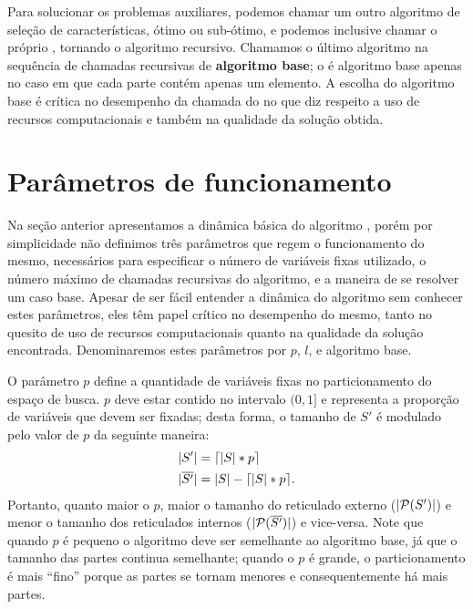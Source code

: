 Para solucionar os problemas auxiliares, podemos chamar um outro 
algoritmo de seleção de características, ótimo ou sub-ótimo, e podemos 
inclusive chamar o próprio , tornando o algoritmo 
recursivo. Chamamos o último algoritmo na sequência de chamadas 
recursivas de {\bf algoritmo base}; o  é algoritmo base 
apenas no caso em que cada parte contém apenas um elemento. A escolha do
algoritmo base é crítica no desempenho da chamada do  
no que diz respeito a uso de recursos computacionais e também na 
qualidade da solução obtida.

\section{Parâmetros de funcionamento}
Na seção anterior apresentamos a dinâmica básica do algoritmo 
, porém por simplicidade não definimos três parâmetros 
que regem o funcionamento do mesmo, necessários para especificar o 
número de variáveis fixas utilizado, o número máximo de chamadas 
recursivas do algoritmo, e a maneira de se resolver um caso base. 
Apesar de ser fácil entender a dinâmica do algoritmo sem conhecer estes 
parâmetros, eles têm papel crítico no desempenho do mesmo, tanto no 
quesito de uso de recursos computacionais quanto na qualidade da solução 
encontrada. Denominaremos estes parâmetros por $p$, $l$, e algoritmo 
base.

O parâmetro $p$ define a quantidade de variáveis fixas no 
particionamento do espaço de busca. $p$ deve estar contido no intervalo 
$(0, 1]$ e representa a proporção de variáveis que devem ser fixadas; desta 
forma, o tamanho de $S'$ é modulado pelo valor de $p$ da seguinte maneira:
\begin{subequations}
\begin{align}
    |S'| & =  \lceil |S| * p \rceil \nonumber \\
    |\overline{S'}| & = |S| - \lceil |S| * p \rceil. \nonumber
\end{align}
\end{subequations}
Portanto, quanto maior o $p$, maior o tamanho do reticulado externo 
($|\mathcal{P} (S')|$) e menor o tamanho dos reticulados internos 
($|\mathcal{P}(\overline{S'})|$) e vice-versa. Note que quando $p$ é 
pequeno o algoritmo  deve ser semelhante ao algoritmo 
base, já que o tamanho das partes continua semelhante; quando o $p$ é
grande, o particionamento é mais ``fino'' porque as partes se tornam 
menores e consequentemente há mais partes.

